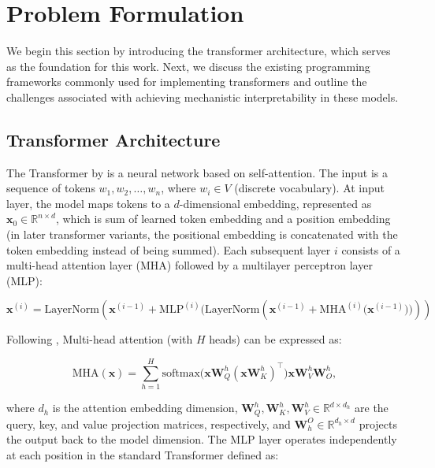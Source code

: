 
\section{Problem Formulation}
\label{ch:problem-formulation}

We begin this section by introducing the transformer architecture, which serves as the foundation for this work. Next, we discuss the existing programming frameworks commonly used for implementing transformers and outline the challenges associated with achieving mechanistic interpretability in these models.

\subsection{Transformer Architecture}

The Transformer by \textcite{vaswani2017attention} is a neural network based on self-attention. The input is a sequence of tokens $w_1, w_2, \dots, w_n$, where $w_i \in V$ (discrete vocabulary). At input layer, the model maps tokens to a $d$-dimensional embedding, represented as $\mathbf{x}_0 \in \mathbb{R}^{n \times d}$, which is sum of learned token embedding and a position embedding (in later transformer variants, the positional embedding is concatenated with the token embedding instead of being summed). Each subsequent layer $i$ consists of a multi-head attention layer (MHA) followed by a multilayer perceptron layer (MLP):

\[
\mathbf{x}^{(i)} = \text{LayerNorm} ( \mathbf{x}^{(i-1)}  +  \text{MLP}^{(i)}\big  ( \text{LayerNorm}   (\mathbf{x}^{(i-1)} + \text{MHA}^{(i)}\big (\mathbf{x}^{(i-1)}\big ) \big )))
\]

Following \textcite{elhage2021mathematical}, Multi-head attention (with $H$ heads) can be expressed as:

\[
\text{MHA}(\mathbf{x}) =  \sum_{h=1}^{H} \text{softmax} \big(\mathbf{x} \mathbf{W}_Q^h (\mathbf{x} \mathbf{W}_K^h )^\top \big) \mathbf{x} \mathbf{W}_V^h \mathbf{W}_O^h,
\]

where $d_h$ is the attention embedding dimension, $\mathbf{W}_Q^h, \mathbf{W}_K^h, \mathbf{W}_V^h \in \mathbb{R}^{d \times d_h}$ are the query, key, and value projection matrices, respectively, and $\mathbf{W}_h^O \in \mathbb{R}^{d_h \times d}$ projects the output back to the model dimension.
The MLP layer operates independently at each position in the standard Transformer defined as:

